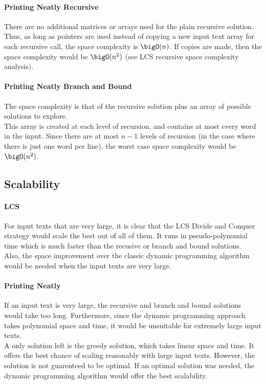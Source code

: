 	\paragraph{Printing Neatly Recursive}
		There are no additional matrices or arrays used for the plain recursive solution. Thus, as long as pointers are used instead of copying a new input text array for each recursive call, the space complexity is $\bigO(n)$. If copies are made, then the space complexity would be $\bigO(n^2)$ (see LCS recursive space complexity analysis).

	\paragraph{Printing Neatly Branch and Bound}
		The space complexity is that of the recursive solution plus an array of possible solutions to explore. \\This array is created at each level of recursion, and contains at most every word in the input. Since there are at most $n-1$ levels of recursion (in the case where there is just one word per line), the worst case space complexity would be $\bigO(n^2)$.


\subsection{Scalability}

	\paragraph{LCS}
		For input texts that are very large, it is clear that the LCS Divide and Conquer strategy would scale the best out of all of them. It runs in pseudo-polynomial time which is much faster than the recusive or branch and bound solutions. \\
		Also, the space improvement over the classic dynamic programming algorithm would be needed when the input texts are very large.

	\paragraph{Printing Neatly}
		If an input text is very large, the recursive and branch and bound solutions would take too long. Furthermore, since the dynamic programming approach takes polynomial space and time, it would be unsuitable for extremely large input texts. \\
		A only solution left is the greedy solution, which takes linear space and time. It offers the best chance of scaling reasonably with large input texts. However, the solution is not guarenteed to be optimal. If an optimal solution was needed, the dynamic programming algorithm would offer the best scalability.
